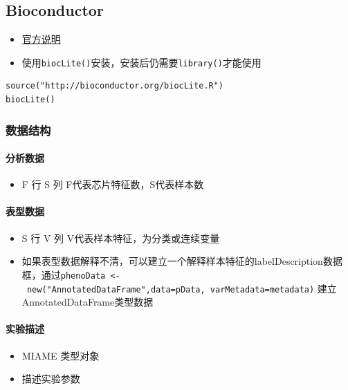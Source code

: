 \documentclass[]{book}
\providecommand{\tightlist}{%
  \setlength{\itemsep}{0pt}\setlength{\parskip}{0pt}}
\let\oldparagraph\paragraph
\renewcommand{\paragraph}[1]{\oldparagraph{#1}\mbox{}}
\begin{document}
\hypertarget{bioconductor}{%
\subsection{Bioconductor}\label{bioconductor}}

\begin{itemize}
\tightlist
\item
  \href{http://bioconductor.org/install/}{官方说明}
\item
  使用\texttt{biocLite()}安装，安装后仍需要\texttt{library()}才能使用
\end{itemize}

\begin{verbatim}
source("http://bioconductor.org/biocLite.R")
biocLite()
\end{verbatim}

\hypertarget{-1}{%
\subsubsection{数据结构}\label{-1}}

\paragraph{分析数据}

\begin{itemize}
\tightlist
\item
  F 行 S 列 F代表芯片特征数，S代表样本数
\end{itemize}

\paragraph{表型数据}

\begin{itemize}
\tightlist
\item
  S 行 V 列 V代表样本特征，为分类或连续变量
\item
  如果表型数据解释不清，可以建立一个解释样本特征的labelDescription数据框，通过\texttt{phenoData\ \textless{}-\ new("AnnotatedDataFrame",data=pData,\ varMetadata=metadata)} 建立AnnotatedDataFrame类型数据
\end{itemize}

\paragraph{实验描述}

\begin{itemize}
\tightlist
\item
  MIAME 类型对象
\item
  描述实验参数
\end{itemize}
\end{document}

